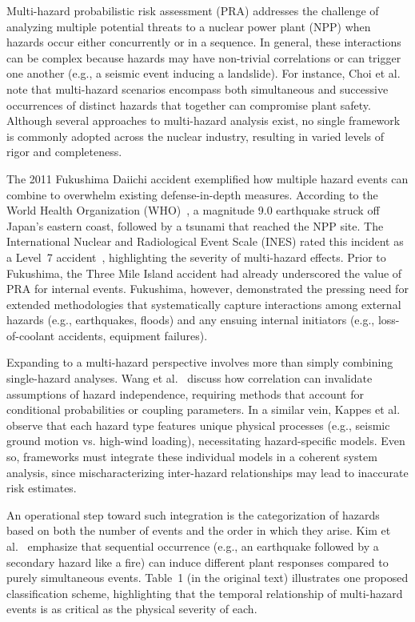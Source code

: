 Multi-hazard probabilistic risk assessment (PRA) addresses the challenge of analyzing multiple potential threats to a nuclear power plant (NPP) when hazards occur either concurrently or in a sequence. In general, these interactions can be complex because hazards may have non-trivial correlations or can trigger one another (e.g., a seismic event inducing a landslide). For instance, Choi et al.~\cite{Choi2021review} note that multi-hazard scenarios encompass both simultaneous and successive occurrences of distinct hazards that together can compromise plant safety. Although several approaches to multi-hazard analysis exist, no single framework is commonly adopted across the nuclear industry, resulting in varied levels of rigor and completeness.

The 2011 Fukushima Daiichi accident exemplified how multiple hazard events can combine to overwhelm existing defense-in-depth measures. According to the World Health Organization (WHO)~\cite{Great}, a magnitude 9.0 earthquake struck off Japan’s eastern coast, followed by a tsunami that reached the NPP site. The International Nuclear and Radiological Event Scale (INES) rated this incident as a Level~7 accident~\cite{International}, highlighting the severity of multi-hazard effects. Prior to Fukushima, the Three Mile Island accident had already underscored the value of PRA for internal events. Fukushima, however, demonstrated the pressing need for extended methodologies that systematically capture interactions among external hazards (e.g., earthquakes, floods) and any ensuing internal initiators (e.g., loss-of-coolant accidents, equipment failures).

Expanding to a multi-hazard perspective involves more than simply combining single-hazard analyses. Wang et al.~\cite{Wang2020review} discuss how correlation can invalidate assumptions of hazard independence, requiring methods that account for conditional probabilities or coupling parameters. In a similar vein, Kappes et al.~\cite{Kappes2012Challenges} observe that each hazard type features unique physical processes (e.g., seismic ground motion vs. high-wind loading), necessitating hazard-specific models. Even so, frameworks must integrate these individual models in a coherent system analysis, since mischaracterizing inter-hazard relationships may lead to inaccurate risk estimates.

An operational step toward such integration is the categorization of hazards based on both the number of events and the order in which they arise. Kim et al.~\cite{Kim2019PRELIMINARY} emphasize that sequential occurrence (e.g., an earthquake followed by a secondary hazard like a fire) can induce different plant responses compared to purely simultaneous events. Table~1 (in the original text) illustrates one proposed classification scheme, highlighting that the temporal relationship of multi-hazard events is as critical as the physical severity of each.

